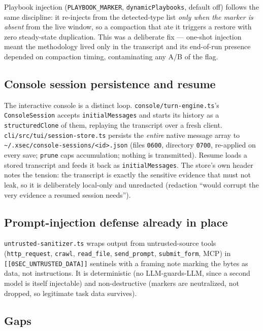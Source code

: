 \documentclass[11pt]{article}
\begin{document}
Playbook injection (\texttt{PLAYBOOK\_MARKER}, \texttt{dynamicPlaybooks},
default off) follows the same discipline: it re-injects from the detected-type
list \emph{only when the marker is absent} from the live window, so a compaction
that ate it triggers a restore with zero steady-state duplication. This was a
deliberate fix --- one-shot injection meant the methodology lived only in the
transcript and its end-of-run presence depended on compaction timing,
contaminating any A/B of the flag.

\subsection{Console session persistence and resume}

The interactive console is a distinct loop. \texttt{console/turn-engine.ts}'s
\texttt{ConsoleSession} accepts \texttt{initialMessages} and starts its history
as a \texttt{structuredClone} of them, replaying the transcript over a fresh
client. \texttt{cli/src/tui/session-store.ts} persists the \emph{entire} native
message array to \texttt{\~{}/.xsec/console-sessions/<id>.json} (files
\texttt{0600}, directory \texttt{0700}, re-applied on every save; \texttt{prune}
caps accumulation; nothing is transmitted). Resume loads a stored transcript and
feeds it back as \texttt{initialMessages}. The store's own header notes the
tension: the transcript is exactly the sensitive evidence that must not leak, so
it is deliberately local-only and unredacted (redaction ``would corrupt the very
evidence a resumed session needs'').

\subsection{Prompt-injection defense already in place}

\texttt{untrusted-sanitizer.ts} wraps output from untrusted-source tools
(\texttt{http\_request}, \texttt{crawl}, \texttt{read\_file}, \texttt{send\_prompt},
\texttt{submit\_form}, MCP) in \texttt{[[0SEC\_UNTRUSTED\_DATA]]} sentinels with a
framing note marking the bytes as data, not instructions. It is deterministic
(no LLM-guards-LLM, since a second model is itself injectable) and
non-destructive (markers are neutralized, not dropped, so legitimate task data
survives).

\subsection{Gaps}
\end{document}
